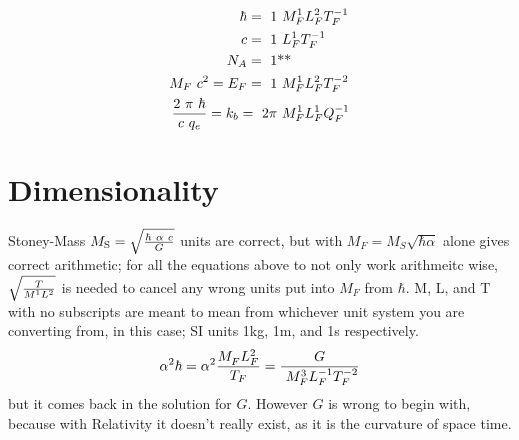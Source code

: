 \begin{multicols}{2}
\begin{multicols}{2}[\setlength{\columnseprule}{0pt}]
\begin{align*}
\hbar = ~1 & ~M_F^{1}L_F^{2}T_F^{-1}\\
c = ~1 & ~L_F^{1}T_F^{-1}\\
N_A = ~1 &\text{**}\\
M_F~ c^2 =E_F = ~1 & ~M_F^{1}L_F^{2}T_F^{-2}\\
{2~\pi~\hbar \over c ~ q_e}=k_b = ~2\pi & ~M_F^{1}L_F^{1}Q_F^{-1}
\end{align*}\noindent\end{multicols}\noindent
\noindent\section {Dimensionality}Stoney-Mass $M_{{\text{S}}} = \sqrt{\hbar ~ \alpha ~c \over G}$ units are correct, but with $M_F = M_S \sqrt{\hbar \alpha}$ alone gives correct arithmetic;
 for all the equations above to not only work arithmeitc wise, $\sqrt{T \over M^{1}L^{2}}$ is needed to cancel any wrong units put into $M_F$ from $\hbar$. M, L, and T with no subscripts are meant to mean from whichever unit system you are converting from, in this case; SI units 1kg, 1m, and 1s respectively.
$$\alpha^2\hbar= \alpha^2 {M_F^{}L_F^{2} \over T_F} ={G \over ~M_F^{3}L_F^{-1}T_F^{-2}}$$
but it comes back in the solution for $G$. However $G$ is wrong to begin with, because with Relativity it doesn't really exist, as it is the curvature of space time.

\end{multicols}
